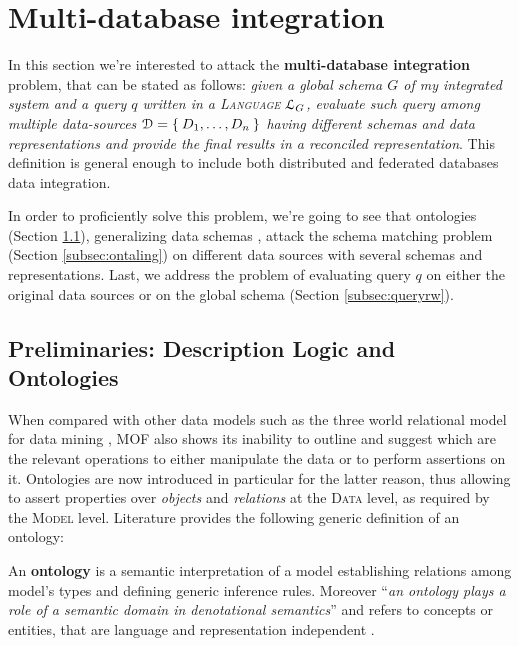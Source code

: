 \section{Multi-database integration}\label{sec:integsurvey}
In this section we're interested to attack the \textbf{multi-database integration} problem, that can be stated as follows: \textit{given a global schema $G$ of my integrated system and a query $q$ written in a  \textsc{Language} $\langg_G$, evaluate such query among multiple data-sources $\mathcal{D}=\Set{D_1,\dots, D_n}$ having   different schemas and data representations and provide the final results in a reconciled representation}. This definition is general enough to include both distributed and federated databases data integration.

In order to proficiently solve this problem, we're going to see that ontologies (Section \ref{sec:ontology}), generalizing data schemas  \cite{GangemiP13}, attack the schema matching problem (Section \ref{subsec:ontaling}) on different data sources with several schemas and representations. Last, we address the problem of evaluating query $q$ on either the original data sources or on the global schema (Section \ref{subsec:queryrw}).

\subsection{Preliminaries: Description Logic and Ontologies}\label{sec:ontology}
When compared with other data models such as the three world relational model for data mining \cite{Calders2006}, MOF also shows its inability to outline and suggest which are the relevant operations to either manipulate the data or to perform assertions on it. Ontologies are now introduced in particular for the latter reason, thus allowing to assert properties over \textit{objects} and \textit{relations} at the \textsc{Data} level, as required by the \textsc{Model} level. Literature provides the following generic definition of an ontology:

\begin{definition}
	\label{def:taonta}
	An \textbf{ontology} \cite{Allemang2011} is a semantic interpretation of a model establishing relations among model's types and defining generic inference rules. Moreover ``\textit{an ontology plays a role of a semantic domain in denotational semantics}'' \cite{saeki} and refers to concepts or entities, that are language  and representation independent \cite{mathmeta}.
\end{definition}

